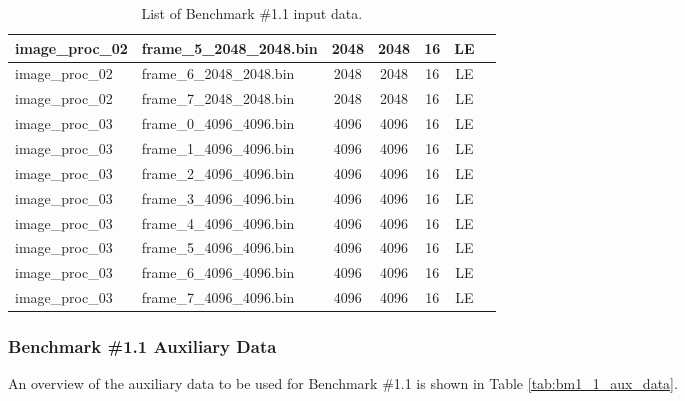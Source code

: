 \begin{table}[!h]
\begin{tabular}{|l|l|c|c|c|c|c|}
        image\_proc\_02	        & frame\_5\_2048\_2048.bin     & 2048          & 2048          & 16            & LE            \\ \hline
        image\_proc\_02	        & frame\_6\_2048\_2048.bin     & 2048          & 2048          & 16            & LE            \\ \hline
        image\_proc\_02	        & frame\_7\_2048\_2048.bin     & 2048          & 2048          & 16            & LE            \\ \hline
        \hline
        image\_proc\_03	        & frame\_0\_4096\_4096.bin     & 4096          & 4096          & 16            & LE            \\ \hline
        image\_proc\_03	        & frame\_1\_4096\_4096.bin     & 4096          & 4096          & 16            & LE            \\ \hline
        image\_proc\_03	        & frame\_2\_4096\_4096.bin     & 4096          & 4096          & 16            & LE            \\ \hline
        image\_proc\_03	        & frame\_3\_4096\_4096.bin     & 4096          & 4096          & 16            & LE            \\ \hline
        image\_proc\_03	        & frame\_4\_4096\_4096.bin     & 4096          & 4096          & 16            & LE            \\ \hline
        image\_proc\_03	        & frame\_5\_4096\_4096.bin     & 4096          & 4096          & 16            & LE            \\ \hline
        image\_proc\_03	        & frame\_6\_4096\_4096.bin     & 4096          & 4096          & 16            & LE            \\ \hline
        image\_proc\_03	        & frame\_7\_4096\_4096.bin     & 4096          & 4096          & 16            & LE            \\ \hline
    \end{tabular}
    \caption{List of Benchmark \#1.1 input data.}
    \label{tab:bm1_1_input_data}
\end{table}

\subsubsection{Benchmark \#1.1 Auxiliary Data}

An overview of the auxiliary data to be used for Benchmark \#1.1 is shown in Table \ref{tab:bm1_1_aux_data}.

